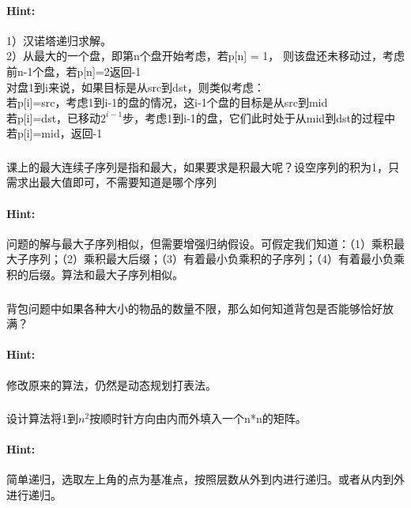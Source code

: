 \documentclass{article}
\begin{document}
     \paragraph{Hint:}1）汉诺塔递归求解。\\
     2）从最大的一个盘，即第n个盘开始考虑，若p[n] = 1， 则该盘还未移动过，考虑前n-1个盘，若p[n]=2返回-1\\
     对盘1到i来说，如果目标是从src到dst，则类似考虑：\\
     若p[i]=src，考虑1到i-1的盘的情况，这i-1个盘的目标是从src到mid\\
     若p[i]=dst，已移动$2^{i-1}$步，考虑1到i-1的盘，它们此时处于从mid到dst的过程中\\
     若p[i]=mid，返回-1\\
     
     \subsubsection{}课上的最大连续子序列是指和最大，如果要求是积最大呢？设空序列的积为1，只需求出最大值即可，不需要知道是哪个序列
     \paragraph{Hint:}问题的解与最大子序列相似，但需要增强归纳假设。可假定我们知道：（1）乘积最大子序列；（2）乘积最大后缀；（3）有着最小负乘积的子序列；（4）有着最小负乘积的后缀。算法和最大子序列相似。
     
     \subsubsection{}背包问题中如果各种大小的物品的数量不限，那么如何知道背包是否能够恰好放满？
     \paragraph{Hint:}修改原来的算法，仍然是动态规划打表法。
     
     \subsubsection{}设计算法将1到$n^{2}$按顺时针方向由内而外填入一个n*n的矩阵。
     \paragraph{Hint:}简单递归，选取左上角的点为基准点，按照层数从外到内进行递归。或者从内到外进行递归。
     
\end{document}
